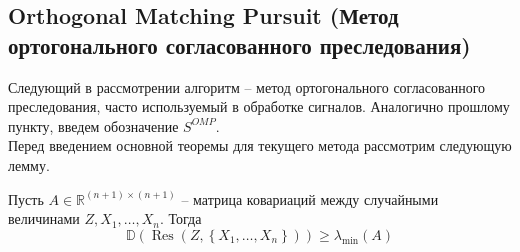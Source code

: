 \documentclass[preprint,12pt]{elsarticle}
\begin{document}
\subsection{Orthogonal Matching Pursuit (Метод ортогонального согласованного преследования)}
Следующий в рассмотрении алгоритм -- метод ортогонального согласованного преследования, часто используемый в обработке сигналов. Аналогично прошлому пункту, введем обозначение $S^{OMP}$. \\

Перед введением основной теоремы для текущего метода рассмотрим следующую лемму.
\begin{lemma}
Пусть $A\in\mathbb{R}^{(n+1)\times(n+1)}$ -- матрица ковариаций между случайными величинами $Z, X_1, \dots, X_n$. Тогда 
$$\mathbb{D}\left(\operatorname{Res}\left(Z,\left\{X_{1}, \ldots, X_{n}\right\}\right)\right) \geq \lambda_{\min }(A)$$
\end{lemma}
\end{document}
